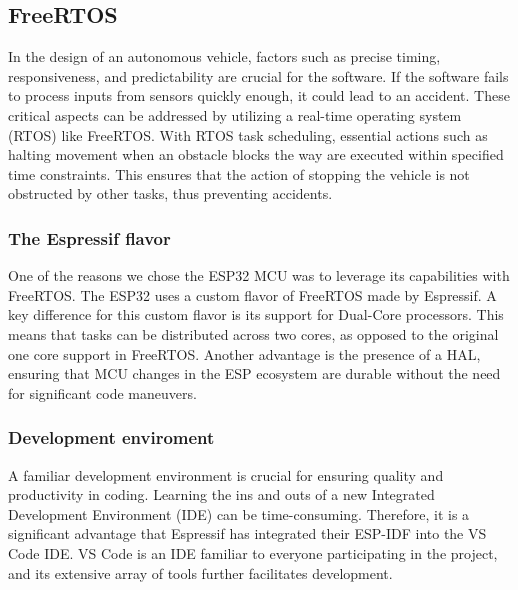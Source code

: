 \documentclass[../report.tex]{subfiles}
\begin{document}
    \subsection{FreeRTOS}
    In the design of an autonomous vehicle, factors such as precise timing,
    responsiveness, and predictability are crucial for the software. If the
    software fails to process inputs from sensors quickly enough, it could lead
    to an accident. These critical aspects can be addressed by utilizing a
    real-time operating system (RTOS) like FreeRTOS. With RTOS task scheduling,
    essential actions such as halting movement when an obstacle blocks the way
    are executed within specified time constraints. This ensures that the
    action of stopping the vehicle is not obstructed by other tasks, thus
    preventing accidents.

    \subsubsection{The Espressif flavor}
    One of the reasons we chose the ESP32 MCU was to leverage its capabilities
    with FreeRTOS. The ESP32 uses a custom flavor of FreeRTOS made by
    Espressif. A key difference for this custom flavor is its support for
    Dual-Core processors. This means that tasks can be distributed across two
    cores, as opposed to the original one core support in FreeRTOS. Another
    advantage is the presence of a HAL, ensuring that MCU changes in the ESP
    ecosystem are durable without the need for significant code maneuvers.

    \subsubsection{Development enviroment}
    A familiar development environment is crucial for ensuring quality and
    productivity in coding. Learning the ins and outs of a new Integrated
    Development Environment (IDE) can be time-consuming. Therefore, it is a
    significant advantage that Espressif has integrated their ESP-IDF into the
    VS Code IDE. VS Code is an IDE familiar to everyone participating in the
    project, and its extensive array of tools further facilitates development.
\end{document}

